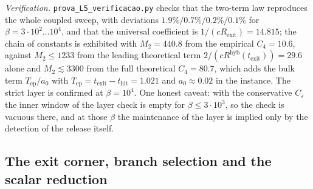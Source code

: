 \documentclass[11pt]{article}
\theoremstyle{definition}
\theoremstyle{remark}
\newcommand{\thit}{t_{\mathrm{hit}}}
\newcommand{\texit}{t_{\mathrm{exit}}}
\newcommand{\Tep}{T_{\mathrm{ep}}}                 %
\newcommand{\hyb}{\mathrm{hyb}}
\begin{document}
\noindent\emph{Verification.} \texttt{prova\_L5\_verificacao.py} checks that the
two-term law reproduces the whole coupled sweep, with deviations
$1.9\%/0.7\%/0.2\%/0.1\%$ for $\beta=3\cdot10^2\ldots10^4$, and that the universal
coefficient is $1/(cR_{\mathrm{exit}})=14.815$; the chain of constants is
exhibited with $M_2=440.8$ from the empirical $C_4=10.6$, against
$M_2\le1233$ from the leading theoretical term $2/(cR^{\hyb}(\texit))=29.6$ alone
and $M_2\lesssim3300$ from the full theoretical $C_4=80.7$, which adds the
bulk term $\Tep/a_0$ with $\Tep=\texit-\thit=1.021$ and $a_0\approx0.02$ in the
instance. The strict layer is
confirmed at $\beta=10^4$. One honest caveat: with the conservative
$C_\varepsilon$ the inner window of the layer check is empty for
$\beta\le3\cdot10^3$, so the check is vacuous there, and at those $\beta$ the
maintenance of the layer is implied only by the detection of the release itself.

\subsection{The exit corner, branch selection and the scalar reduction}\label{app:L6}
\end{document}
